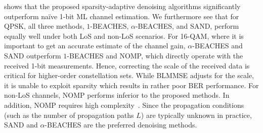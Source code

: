  shows that the proposed sparsity-adaptive denoising algorithms significantly outperform na\"ive 1-bit ML channel estimation. We furthermore see that for QPSK, all three methods,  $1$-BEACHES, $\alpha$-BEACHES, and SAND, perform equally well under both LoS and non-LoS scenarios. For 16-QAM, where it is important to get an accurate estimate of the channel gain, $\alpha$-BEACHES and SAND outperform $1$-BEACHES and NOMP, which directly operate with the received 1-bit measurements. 
Hence, correcting the scale of the received data is critical for higher-order constellation sets.
%
While BLMMSE adjusts for the scale, it is unable to exploit sparsity which results in rather poor BER performance.
%
For non-LoS channels, NOMP performs inferior to the proposed methods. 
In addition, NOMP requires high complexity~\cite{mirfarshbafan19a}.
%
Since the propagation conditions (such as the number of propagation paths $L$) are typically unknown in practice, SAND and $\alpha$-BEACHES are the preferred denoising methods. 
%

